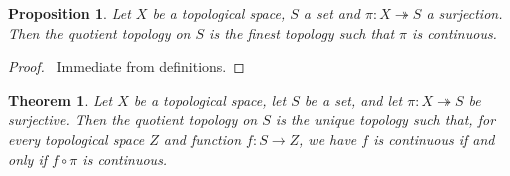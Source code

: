 \documentclass{book}
\let\qed\relax
\newtheorem{prop}[ax]{Proposition}
\newtheorem{thm}[ax]{Theorem}
\theoremstyle{definition}
\begin{document}
\begin{prop}
Let $X$ be a topological space, $S$ a set and $\pi : X \twoheadrightarrow S$ a surjection. Then the quotient topology on $S$ is the finest topology such that $\pi$ is continuous.
\end{prop}

\begin{proof}
\pf\ Immediate from definitions. \qed
\end{proof}

\begin{thm}
\label{thm:quotient_topology_universal}
Let $X$ be a topological space, let $S$ be a set, and let $\pi : X \twoheadrightarrow S$ be surjective. Then the quotient topology on $S$ is the unique topology such that, for every topological space $Z$ and function $f : S \rightarrow Z$, we have $f$ is continuous if and only if $f \circ \pi$ is continuous.
\end{thm}
\end{document}
